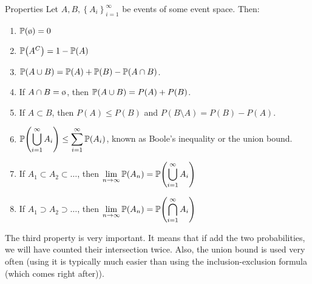 \documentclass[a4paper]{article}
\begin{document}
\begin{parag}{Properties}
    Let $A, B, \left\{A_i\right\}_{i=1}^{\infty}$ be events of some event space. Then:
    \begin{enumerate}
        \item $\prob\left(\o\right) = 0$
        \item $\prob\left(A^C\right) = 1 - \prob\left(A\right)$
        \item $\prob\left(A \cup B\right) = \prob\left(A\right) + \prob\left(B\right) - \prob\left(A \cap B\right)$.
        \item If $A \cap B = \o$, then $\prob\left(A \cup B\right) = P\left(A\right) + P\left(B\right)$.
        \item If $A \subset B$, then $P\left(A\right) \leq P\left(B\right)$ and $P\left(B \setminus A\right) = P\left(B\right) - P\left(A\right)$.
        \item $\displaystyle \prob\left(\bigcup_{i=1}^{\infty} A_i\right) \leq \sum_{i=1}^{\infty} \prob\left(A_i\right)$, known as Boole's inequality or the union bound.
        \item If $A_1 \subset A_2 \subset \ldots$, then $\displaystyle \lim_{n \to \infty} \prob\left(A_n\right) = \prob\left(\bigcup_{i=1}^{\infty} A_i\right)$
        \item If $A_1 \supset A_2 \supset \ldots$, then $\displaystyle \lim_{n \to \infty} \prob\left(A_n\right) = \prob\left(\bigcap_{i=1}^{\infty} A_i\right)$
    \end{enumerate}
    
    The third property is very important. It means that if add the two probabilities, we will have counted their intersection twice. Also, the union bound is used very often (using it is typically much easier than using the inclusion-exclusion formula (which comes right after)).
\end{parag}
\end{document}
